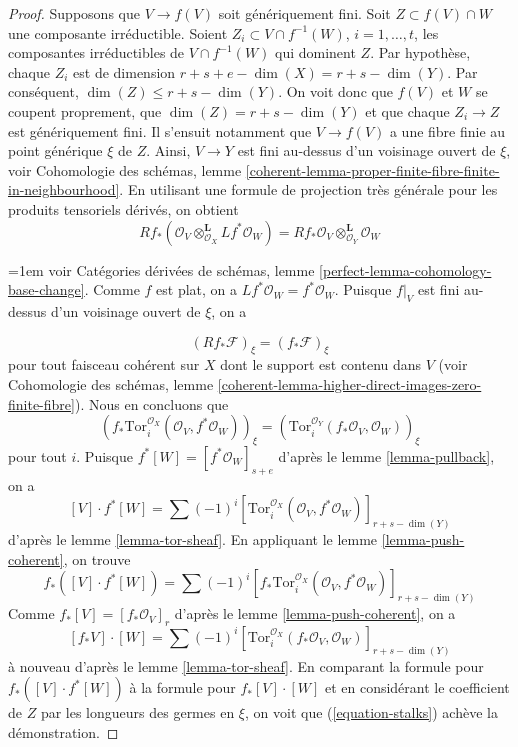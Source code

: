 \begin{proof}
\medskip\noindent
Supposons que $V \to f(V)$ soit génériquement fini. Soit $Z \subset f(V) \cap W$
une composante irréductible. Soient $Z_i \subset V \cap f^{-1}(W)$,
$i = 1, \ldots, t$, les composantes irréductibles de $V \cap f^{-1}(W)$
qui dominent $Z$. Par hypothèse, chaque $Z_i$ est de dimension
$r + s + e - \dim(X) = r + s - \dim(Y)$. Par conséquent,
$\dim(Z) \leq r + s - \dim(Y)$. On voit donc que $f(V)$ et $W$
se coupent proprement, que $\dim(Z) = r + s - \dim(Y)$ et que chaque
$Z_i \to Z$ est génériquement fini. Il s'ensuit notamment que
$V \to f(V)$ a une fibre finie au point générique $\xi$ de $Z$.
Ainsi, $V \to Y$ est fini au-dessus d'un voisinage ouvert de $\xi$, voir
Cohomologie des schémas, lemme
\ref{coherent-lemma-proper-finite-fibre-finite-in-neighbourhood}.
En utilisant une formule de projection très générale pour les produits tensoriels dérivés, on obtient
$$
Rf_*(\mathcal{O}_V \otimes_{\mathcal{O}_X}^\mathbf{L} Lf^*\mathcal{O}_W) =
Rf_*\mathcal{O}_V \otimes_{\mathcal{O}_Y}^\mathbf{L} \mathcal{O}_W
$$
{\emergencystretch=1em voir Catégories dérivées de schémas, lemme
\ref{perfect-lemma-cohomology-base-change}.
Comme $f$ est plat, on a $Lf^*\mathcal{O}_W = f^*\mathcal{O}_W$.
Puisque $f|_V$ est fini au-dessus d'un voisinage ouvert de $\xi$, on a\par}
$$
(Rf_*\mathcal{F})_\xi = (f_*\mathcal{F})_\xi
$$
pour tout faisceau cohérent sur $X$ dont le support est contenu dans $V$
(voir Cohomologie des schémas, lemme
\ref{coherent-lemma-higher-direct-images-zero-finite-fibre}). Nous
en concluons que
\begin{equation}
\label{equation-stalks}
\left(
f_*\text{Tor}_i^{\mathcal{O}_X}(\mathcal{O}_V, f^*\mathcal{O}_W)
\right)_\xi =
\left(\text{Tor}_i^{\mathcal{O}_Y}(f_*\mathcal{O}_V, \mathcal{O}_W)\right)_\xi
\end{equation}
pour tout $i$. Puisque $f^*[W] = [f^*\mathcal{O}_W]_{s + e}$ d'après le
lemme \ref{lemma-pullback}, on a
$$
[V] \cdot f^*[W] =
\sum (-1)^i
[\text{Tor}_i^{\mathcal{O}_X}(\mathcal{O}_V,
f^*\mathcal{O}_W)]_{r + s - \dim(Y)}
$$
d'après le lemme \ref{lemma-tor-sheaf}. En appliquant le
lemme \ref{lemma-push-coherent},
on trouve
$$
f_*([V] \cdot f^*[W]) =
\sum (-1)^i
[f_*\text{Tor}_i^{\mathcal{O}_X}(\mathcal{O}_V,
f^*\mathcal{O}_W)]_{r + s - \dim(Y)}
$$
Comme $f_*[V] = [f_*\mathcal{O}_V]_r$ d'après le
lemme \ref{lemma-push-coherent}, on a
$$
[f_*V] \cdot [W] =
\sum (-1)^i
[\text{Tor}_i^{\mathcal{O}_X}(f_*\mathcal{O}_V,
\mathcal{O}_W)]_{r + s - \dim(Y)}
$$
à nouveau d'après le lemme \ref{lemma-tor-sheaf}.
En comparant la formule pour $f_*([V] \cdot f^*[W])$ à
la formule pour $f_*[V] \cdot [W]$ et en considérant le
coefficient de $Z$ par les longueurs des germes en $\xi$, on voit que
(\ref{equation-stalks}) achève la démonstration.
\end{proof}

